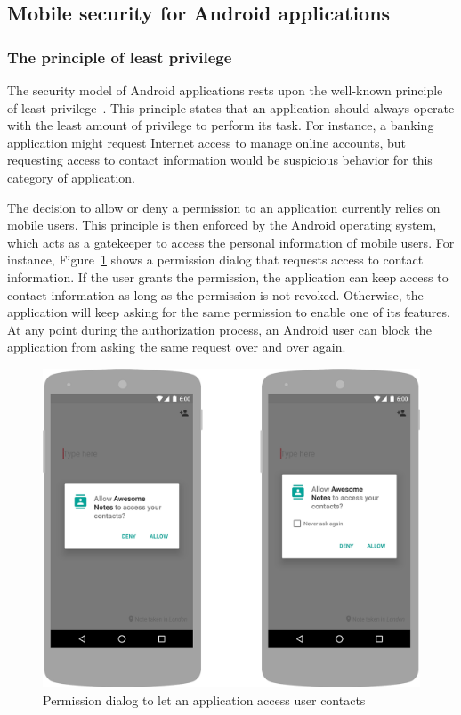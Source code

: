\subsection{Mobile security for Android applications}
\subsubsection{The principle of least privilege}
The security model of Android applications rests upon the well-known principle of least privilege~\cite{google_permissions_2019}.
This principle states that an application should always operate with the least amount of privilege to perform its task.
For instance, a banking application might request Internet access to manage online accounts, but requesting access to contact information would be suspicious behavior for this category of application.

The decision to allow or deny a permission to an application currently relies on mobile users.
This principle is then enforced by the Android operating system, which acts as a gatekeeper to access the personal information of mobile users.
For instance, Figure~\ref{figure:introduction:permissions} shows a permission dialog that requests access to contact information.
If the user grants the permission, the application can keep access to contact information as long as the permission is not revoked.
Otherwise, the application will keep asking for the same permission to enable one of its features.
At any point during the authorization process, an Android user can block the application from asking the same request over and over again.

\begin{figure}[!ht]
        \centering
	\includegraphics[width=0.65\linewidth]{figures/introduction/permissions.png}
	\caption{Permission dialog to let an application access user contacts}
	\label{figure:introduction:permissions}
\end{figure}

